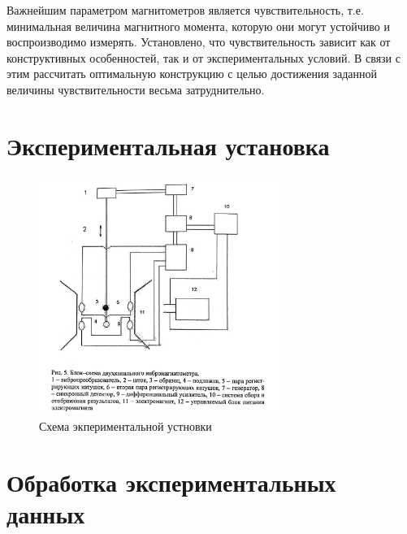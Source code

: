 \documentclass[a4paper,12pt]{article} %
\begin{document}
\noindent Важнейшим параметром магнитометров является чувствительность, т.е. минимальная величина магнитного момента, которую они могут устойчиво и воспроизводимо измерять. Установлено, что чувствительность зависит как от конструктивных особенностей, так и от экспериментальных условий. В связи с этим рассчитать оптимальную конструкцию с целью достижения заданной величины чувствительности весьма затруднительно.

\newpage

\section*{{Экспериментальная установка}}

\begin{figure}[htbp]
    \centering
    \includegraphics[width = 0.7\textwidth]{ustanovka.png}
    \caption{Схема экпериментальной устновки}
    \label{fig:setup}
\end{figure}



\section*{{Обработка экспериментальных данных}}
\end{document}
